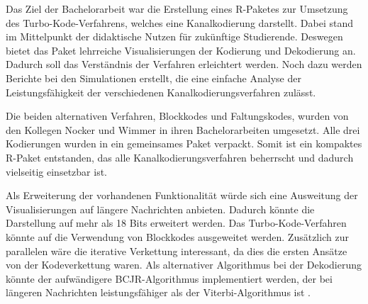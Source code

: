 Das Ziel der Bachelorarbeit war die Erstellung eines R-Paketes zur Umsetzung des  Turbo-Kode-Verfahrens, welches eine Kanalkodierung darstellt. Dabei stand im Mittelpunkt der didaktische Nutzen für zukünftige Studierende. Deswegen bietet das Paket lehrreiche Visualisierungen der Kodierung und Dekodierung an. Dadurch soll das Verständnis der Verfahren erleichtert werden. Noch dazu werden Berichte bei den Simulationen erstellt, die eine einfache Analyse der Leistungsfähigkeit der verschiedenen Kanalkodierungsverfahren zulässt.

Die beiden alternativen Verfahren, Blockkodes und Faltungskodes, wurden von den Kollegen Nocker \cite{nocker} und Wimmer \cite{wimmer} in ihren Bachelorarbeiten umgesetzt. Alle drei Kodierungen wurden in ein gemeinsames Paket verpackt. Somit ist ein kompaktes R-Paket entstanden, das alle Kanalkodierungsverfahren beherrscht und dadurch vielseitig einsetzbar ist.  

Als Erweiterung der vorhandenen Funktionalität würde sich eine Ausweitung der Visualisierungen auf längere Nachrichten anbieten. Dadurch könnte die Darstellung auf mehr als 18 Bits erweitert werden. Das Turbo-Kode-Verfahren könnte auf die Verwendung von Blockkodes ausgeweitet werden. Zusätzlich zur parallelen wäre die iterative Verkettung interessant, da dies die ersten Ansätze von der Kodeverkettung waren. Als alternativer Algorithmus bei der Dekodierung könnte der aufwändigere BCJR-Algorithmus implementiert werden, der bei längeren Nachrichten leistungsfähiger als der Viterbi-Algorithmus ist \cite[233-236]{schoenfeld2012informations}.